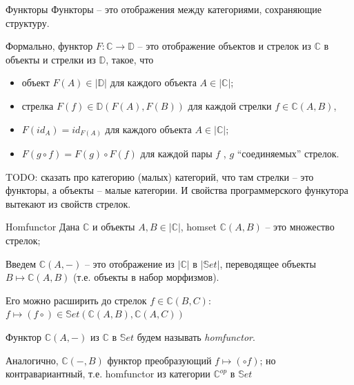 \documentclass[
  russian,
  aspectratio=169,
  xcolor={svgnames},
  hyperref={colorlinks,citecolor=DeepPink4,linkcolor=DarkRed,urlcolor=DarkBlue}]{beamer}
\begin{document}
\begin{frame}[fragile]{Функторы}
Функторы -- это отображения между категориями, сохраняющие структуру.
\vspace{1cm}

Формально, функтор $F: \mathbb{C} \rightarrow \mathbb{D}$ -- это отображение объектов и стрелок из $\mathbb{C}$ в объекты и стрелки из $\mathbb{D}$, такое, что 
\begin{itemize}
 \item объект $F(A) \in |\mathbb{D}|$ для каждого объекта $A \in |\mathbb{C}|$;
 \item стрелка $F(f) \in \mathbb{D}(F(A), F(B))$ для каждой стрелки 
$f \in\mathbb{C}(A, B)$,
 \item $F(id_A ) = id_{F(A)}$ для каждого объекта $A \in |\mathbb{C}|$;
 \item $F (g \circ f) = F (g) \circ F (f)$ для каждой пары $f$ , $g$ ``соединяемых'' стрелок.
\end{itemize}

TODO: сказать про категорию (малых) категорий, что там стрелки -- это функторы, а объекты -- малые категории. И свойства программерского функутора вытекают из свойств стрелок.
\end{frame}

\begin{frame}[fragile]{Homfunctor}
Дана $\mathbb{C}$ и объекты $A,B \in |\mathbb{C}|$, homset $\mathbb{C}(A, B)$ -- это множество стрелок; \vspace{0.5cm}

Введем $\mathbb{C}(A, −)$ -- это отображение из $|\mathbb{C}|$ в $|\mathbb{S}et|$, переводящее объекты $B \mapsto\mathbb{C}(A, B)$ (т.е. объекты в набор морфизмов). \vspace{0.5cm}

Его можно расширить до стрелок $f \in \mathbb{C}(B, C)$:\\
$f \mapsto (f \circ) \in \mathbb{S}et(\mathbb{C}(A, B), \mathbb{C}(A, C))$
\vspace{0.5cm}

Функтор $\mathbb{C}(A, −)$ из $\mathbb{C}$ в $\mathbb{S}et$ будем называть \textit{homfunctor}. \vspace{0.5cm}

Аналогично, $\mathbb{C}(−, B)$ функтор преобразующий $f\mapsto(\circ f)$; но контравариантный, т.е. homfunctor из категории $\mathbb{C}^{op}$ в 
$\mathbb{S}et$

\end{frame}
\end{document}

